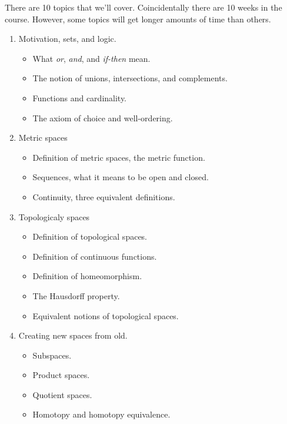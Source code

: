 \documentclass{article}
\begin{document}
    There are 10 topics that we'll cover. Coincidentally there are 10 weeks in
    the course. However, some topics will get longer amounts of time than
    others.
    \begin{enumerate}
        \item Motivation, sets, and logic.
            \begin{itemize}
                \item What \textit{or}, \textit{and}, and \textit{if-then} mean.
                \item The notion of unions, intersections, and complements.
                \item Functions and cardinality.
                \item The axiom of choice and well-ordering.
            \end{itemize}
        \item Metric spaces
            \begin{itemize}
                \item Definition of metric spaces, the metric function.
                \item Sequences, what it means to be open and closed.
                \item Continuity, three equivalent definitions.
            \end{itemize}
        \item Topologicaly spaces
            \begin{itemize}
                \item Definition of topological spaces.
                \item Definition of continuous functions.
                \item Definition of homeomorphism.
                \item The Hausdorff property.
                \item Equivalent notions of topological spaces.
            \end{itemize}
        \item Creating new spaces from old.
            \begin{itemize}
                \item Subspaces.
                \item Product spaces.
                \item Quotient spaces.
                \item Homotopy and homotopy equivalence.
            \end{itemize}

\end{enumerate}
\end{document}
